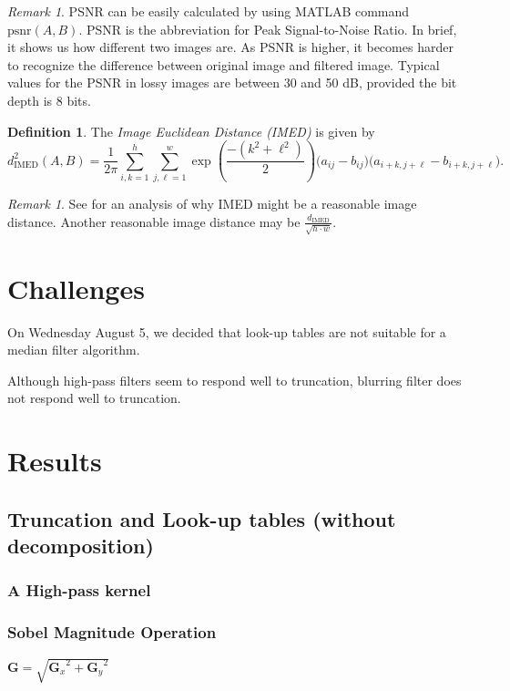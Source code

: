 \documentclass[12pt]{amsart}
\theoremstyle{definition}
\newtheorem{defn}[thm]{Definition}
\theoremstyle{remark}
\newtheorem{rem}[thm]{Remark}
\numberwithin{thm}{section}
\begin{document}
\begin{rem}
PSNR can be easily calculated by using MATLAB command $\textrm{psnr}(A,B)$.
PSNR is the abbreviation for Peak Signal-to-Noise Ratio. In brief, it shows us how different two images are. As PSNR is higher, it becomes harder to recognize the difference between original image and filtered image. Typical values for the PSNR in lossy images are between 30 and 50 dB, provided the bit depth is 8 bits. 
\end{rem}

\begin{defn}
The \emph{Image Euclidean Distance (IMED)} is given by
\[d_\text{IMED}^2(A,B) = \frac{1}{2\pi}\sum_{i,k = 1}^h\sum_{j,\ell = 1}^w \exp\left(\frac{-(k^2+\ell^2)}{2}\right)\big(a_{ij}-b_{ij}\big)\big(a_{i+k,j+\ell} - b_{i+k,j+\ell}\big).\]
\end{defn}
\begin{rem}
See \cite{FWZ05} for an analysis of why IMED might be a reasonable image distance. Another reasonable image distance may be $\frac{d_\text{IMED}}{\sqrt{h\cdot w}}$.
\end{rem}

\section{Challenges}
On Wednesday August 5, we
decided that look-up tables  are not suitable for a median filter algorithm.

Although high-pass filters seem to respond well to truncation, blurring filter does not respond well to truncation.

\section{Results}

\subsection{Truncation and Look-up tables (without decomposition)}

\subsubsection{A High-pass kernel}

\subsubsection{Sobel Magnitude Operation}
$\mathbf{G} = \sqrt{ {\mathbf{G}_x}^2 + {\mathbf{G}_y}^2 }$
\end{document}
